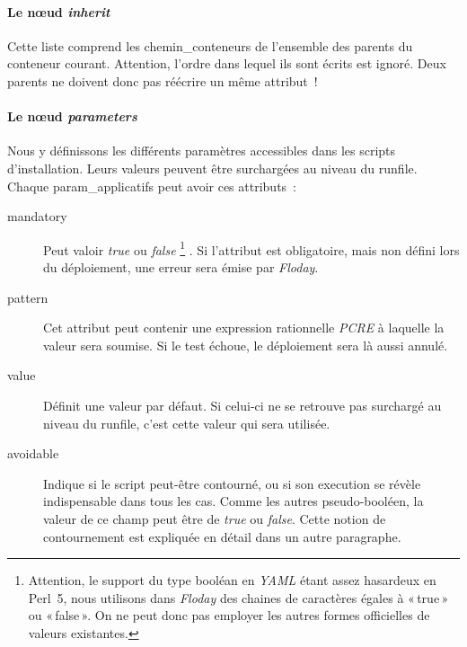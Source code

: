 \paragraph{Le nœud \emph{inherit}}
Cette liste comprend les \glspl{chemin_conteneur} de l'ensemble des parents du conteneur courant.
Attention, l'ordre dans lequel ils sont écrits est ignoré.
Deux parents ne doivent donc pas réécrire un même \gls{attribut} !

\paragraph{Le nœud \emph{parameters}}
Nous y définissons les différents paramètres accessibles dans les scripts d'installation. Leurs valeurs peuvent être surchargées au niveau du \gls{runfile}.
Chaque \gls{param_applicatifs} peut avoir ces attributs~:
\begin{description}
	\item[mandatory] Peut valoir \emph{true} ou \emph{false}%
		\footnote{Attention, le support du type booléan en \emph{YAML} étant assez hasardeux en Perl~5, nous utilisons dans \emph{Floday} des chaines de caractères égales à «\,true\,» ou «\,false\,». On ne peut donc pas employer les autres formes officielles de valeurs existantes.}%
		. Si l'attribut est obligatoire, mais non défini lors du déploiement, une erreur sera émise par \emph{Floday}.
	\item[pattern] Cet attribut peut contenir une expression rationnelle \emph{PCRE} à laquelle la valeur sera soumise. Si le test échoue, le déploiement sera là aussi annulé.
	\item[value] Définit une valeur par défaut. Si celui-ci ne se retrouve pas surchargé au niveau du \gls{runfile}, c'est cette valeur qui sera utilisée.
	\item[avoidable] Indique si le script peut-être contourné, ou si son execution se révèle indispensable dans tous les cas. Comme les autres pseudo-booléen, la valeur de ce champ peut être de \emph{true} ou \emph{false}. Cette notion de contournement est expliquée en détail dans un autre paragraphe.
\end{description}

